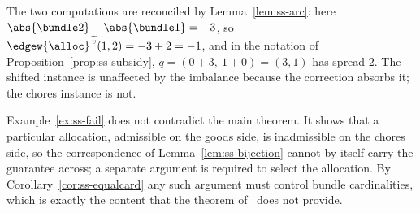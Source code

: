 The two computations are reconciled by Lemma~\ref{lem:ss-arc}: here
$\abs{\bundle2} - \abs{\bundle1} = -3$, so
$\edgew{\alloc}^{\,\widetilde{v}}(1,2) = -3 + 2 = -1$, and in the notation of
Proposition~\ref{prop:ss-subsidy}, $q = (0 + 3,\ 1 + 0) = (3,1)$ has spread
$2$. The shifted instance is unaffected by the imbalance because the
correction absorbs it; the chores instance is not.

\begin{remark}
\label{rem:ss-scope}
Example~\ref{ex:ss-fail} does not contradict the main theorem. It shows that a
particular allocation, admissible on the goods side, is inadmissible on the
chores side, so the correspondence of Lemma~\ref{lem:ss-bijection} cannot by
itself carry the guarantee across; a separate argument is required to select the
allocation. By Corollary~\ref{cor:ss-equalcard} any such argument must control
bundle cardinalities, which is exactly the content that the theorem
of~\cite{BKNS22} does not provide.
\end{remark}
